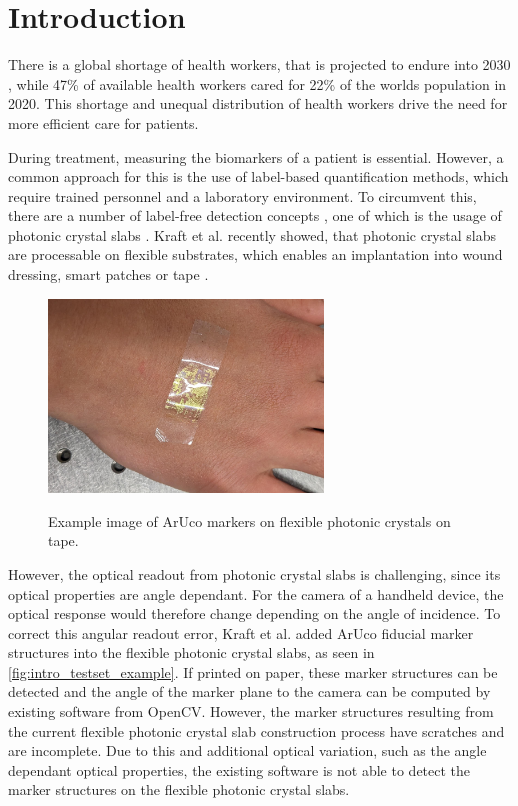 \documentclass[10pt]{book}
\newcommand{\figureref}[1]{\autoref{#1}}
\begin{document}
\tableofcontents
\listoffigures
\mainmatter
\chapter{Introduction}

There is a global shortage of health workers, that is projected to endure into 2030 \cite{BMJHealthWorkforce22}, while 47\% of available health workers cared for 22\% of the worlds population in 2020. This shortage and unequal distribution of health workers drive the need for more efficient care for patients. 

During treatment, measuring the biomarkers of a patient is essential. However, a common approach for this is the use of label-based quantification methods, which require trained personnel and a laboratory environment. To circumvent this, there are a number of label-free detection concepts \cite{rapp2010biosensors}, one of which is the usage of photonic crystal slabs \cite{Pitruzzello_2018}. Kraft et al. recently showed, that photonic crystal slabs are processable on flexible substrates, which enables an implantation into wound dressing, smart patches or tape \cite{Fab23}.

\begin{figure}
  \caption{Example image of \ac{ArUco} markers on flexible photonic crystals on tape.}
  \includegraphics[width=0.65\textwidth]{image/testset_example_crop}
  \label{fig:intro_testset_example}
\end{figure}

However, the optical readout from photonic crystal slabs is challenging, since its optical properties are angle dependant. For the camera of a handheld device, the optical response would therefore change depending on the angle of incidence. To correct this angular readout error, Kraft et al. added \ac{ArUco} fiducial marker structures into the flexible photonic crystal slabs, as seen in \figureref{fig:intro_testset_example}. If printed on paper, these marker structures can be detected and the angle of the marker plane to the camera can be computed by existing software from \ac{OpenCV}. However, the marker structures resulting from the current flexible photonic crystal slab construction process have scratches and are incomplete. Due to this and additional optical variation, such as the angle dependant optical properties, the existing software is not able to detect the marker structures on the flexible photonic crystal slabs.
\end{document}
